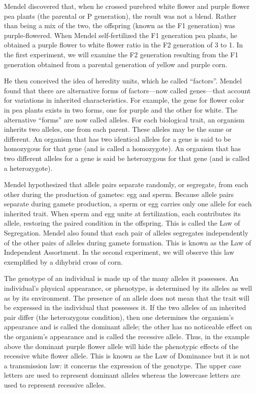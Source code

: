 \documentclass[]{book}
\begin{document}
Mendel discovered that, when he crossed purebred white flower and purple flower pea plants (the parental or P generation), the result was not a blend. Rather than being a mix of the two, the offspring (known as the F1 generation) was purple-flowered. When Mendel self-fertilized the F1 generation pea plants, he obtained a purple flower to white flower ratio in the F2 generation of 3 to 1. In the first experiment, we will examine the F2 generation resulting from the F1 generation obtained from a parental generation of yellow and purple corn.

He then conceived the idea of heredity units, which he called ``factors''. Mendel found that there are alternative forms of factors---now called genes---that account for variations in inherited characteristics. For example, the gene for flower color in pea plants exists in two forms, one for purple and the other for white. The alternative ``forms'' are now called alleles. For each biological trait, an organism inherits two alleles, one from each parent. These alleles may be the same or different. An organism that has two identical alleles for a gene is said to be homozygous for that gene (and is called a homozygote). An organism that has two different alleles for a gene is said be heterozygous for that gene (and is called a heterozygote).

Mendel hypothesized that allele pairs separate randomly, or segregate, from each other during the production of gametes: egg and sperm. Because allele pairs separate during gamete production, a sperm or egg carries only one allele for each inherited trait. When sperm and egg unite at fertilization, each contributes its allele, restoring the paired condition in the offspring. This is called the Law of Segregation. Mendel also found that each pair of alleles segregates independently of the other pairs of alleles during gamete formation. This is known as the Law of Independent Assortment. In the second experiment, we will observe this law exemplified by a dihybrid cross of corn.

The genotype of an individual is made up of the many alleles it possesses. An individual's physical appearance, or phenotype, is determined by its alleles as well as by its environment. The presence of an allele does not mean that the trait will be expressed in the individual that possesses it. If the two alleles of an inherited pair differ (the heterozygous condition), then one determines the organism's appearance and is called the dominant allele; the other has no noticeable effect on the organism's appearance and is called the recessive allele. Thus, in the example above the dominant purple flower allele will hide the phenotypic effects of the recessive white flower allele. This is known as the Law of Dominance but it is not a transmission law: it concerns the expression of the genotype. The upper case letters are used to represent dominant alleles whereas the lowercase letters are used to represent recessive alleles.
\end{document}
